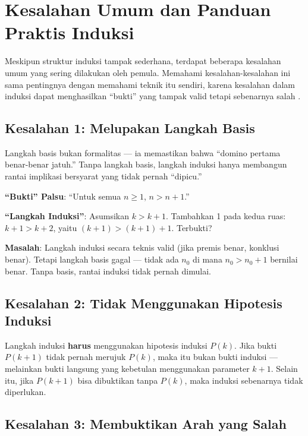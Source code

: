\section{Kesalahan Umum dan Panduan Praktis Induksi}

Meskipun struktur induksi tampak sederhana, terdapat beberapa kesalahan umum yang sering dilakukan oleh pemula. Memahami kesalahan-kesalahan ini sama pentingnya dengan memahami teknik itu sendiri, karena kesalahan dalam induksi dapat menghasilkan ``bukti'' yang tampak valid tetapi sebenarnya salah \cite{hammack2018}.

\subsection{Kesalahan 1: Melupakan Langkah Basis}

Langkah basis bukan formalitas --- ia memastikan bahwa ``domino pertama benar-benar jatuh.'' Tanpa langkah basis, langkah induksi hanya membangun rantai implikasi bersyarat yang tidak pernah ``dipicu.''

\begin{contoh}
\textbf{``Bukti'' Palsu}: ``Untuk semua $n \geq 1$, $n > n + 1$.''

\textbf{``Langkah Induksi''}: Asumsikan $k > k + 1$. Tambahkan 1 pada kedua ruas: $k + 1 > k + 2$, yaitu $(k+1) > (k+1) + 1$. Terbukti?

\textbf{Masalah}: Langkah induksi secara teknis valid (jika premis benar, konklusi benar). Tetapi langkah basis gagal --- tidak ada $n_0$ di mana $n_0 > n_0 + 1$ bernilai benar. Tanpa basis, rantai induksi tidak pernah dimulai.
\end{contoh}

\subsection{Kesalahan 2: Tidak Menggunakan Hipotesis Induksi}

Langkah induksi \textbf{harus} menggunakan hipotesis induksi $P(k)$. Jika bukti $P(k+1)$ tidak pernah merujuk $P(k)$, maka itu bukan bukti induksi --- melainkan bukti langsung yang kebetulan menggunakan parameter $k+1$. Selain itu, jika $P(k+1)$ bisa dibuktikan tanpa $P(k)$, maka induksi sebenarnya tidak diperlukan.

\subsection{Kesalahan 3: Membuktikan Arah yang Salah}

